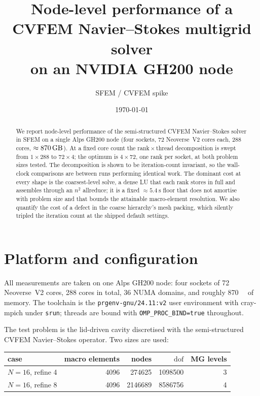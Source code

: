 \documentclass[11pt,a4paper]{article}
\title{Node-level performance of a CVFEM Navier--Stokes multigrid solver\\
       on an NVIDIA GH200 node}
\author{SFEM / CVFEM spike}
\date{\today}
\newcommand{\dofs}{\ensuremath{\mathrm{dof}}}
\begin{document}
\maketitle

\begin{abstract}
We report node-level performance of the semi-structured CVFEM Navier--Stokes
solver in SFEM on a single Alps GH200 node (four sockets, \num{72} Neoverse~V2
cores each, \num{288} cores, \(\approx\SI{870}{\giga\byte}\)). At a fixed core
count the rank\,\(\times\)\,thread decomposition is swept from \(1\times288\) to
\(72\times4\); the optimum is \(4\times72\), one rank per socket, at both problem
sizes tested. The decomposition is shown to be iteration-count invariant, so the
wall-clock comparisons are between runs performing identical work. The dominant
cost at every shape is the coarsest-level solve, a dense LU that each rank stores
in full and assembles through an \(n^2\) allreduce; it is a fixed
\(\approx\SI{5.4}{\second}\) floor that does not amortise with problem size and
that bounds the attainable macro-element resolution. We also quantify the cost of
a defect in the coarse hierarchy's mesh packing, which silently tripled the
iteration count at the shipped default settings.
\end{abstract}

\section{Platform and configuration}

All measurements are taken on one Alps GH200 node: four sockets of \num{72}
Neoverse~V2 cores, \num{288} cores in total, \num{36} NUMA domains, and roughly
\SI{870}{\giga\byte} of memory. The toolchain is the \texttt{prgenv-gnu/24.11:v2}
user environment with cray-mpich under \texttt{srun}; threads are bound with
\texttt{OMP\_PROC\_BIND=true} throughout.

The test problem is the lid-driven cavity discretised with the semi-structured
CVFEM Navier--Stokes operator. Two sizes are used:

\begin{center}
\begin{tabular}{lrrrr}
\toprule
case & macro elements & nodes & \dofs & MG levels \\
\midrule
\(N=16\), refine \num{4} & \num{4096} & \num{274625}  & \num{1098500} & 3 \\
\(N=16\), refine \num{8} & \num{4096} & \num{2146689} & \num{8586756} & 4 \\
\bottomrule
\end{tabular}
\end{center}
\end{document}
